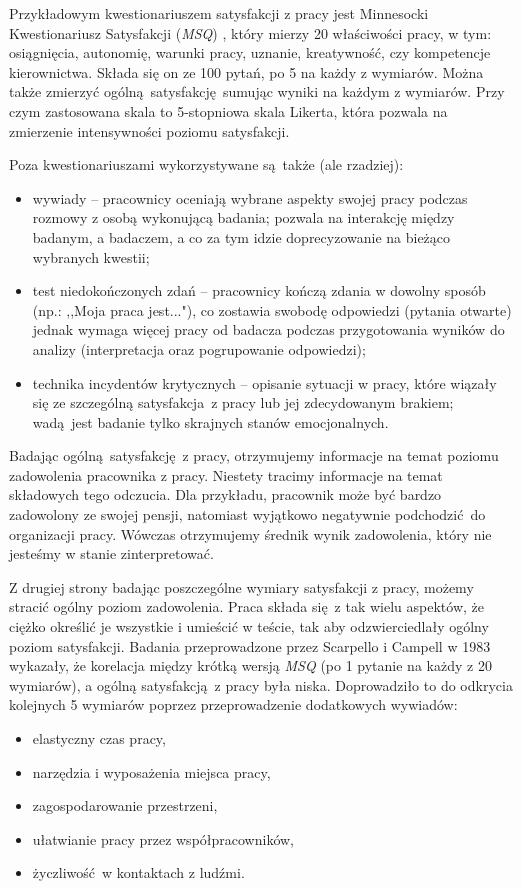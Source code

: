 Przykładowym kwestionariuszem satysfakcji z pracy jest Minnesocki Kwestionariusz Satysfakcji (\emph{MSQ}) \cite{weiss1967manual}, który mierzy 20 właściwości pracy, w tym: osiągnięcia, autonomię, warunki pracy, uznanie, kreatywność, czy kompetencje kierownictwa. Składa się on ze 100 pytań, po 5 na każdy z wymiarów. Można także zmierzyć
ogólną satysfakcję sumując wyniki na każdym z wymiarów. Przy czym zastosowana skala to 5-stopniowa skala Likerta, która pozwala na zmierzenie intensywności poziomu satysfakcji.

Poza kwestionariuszami wykorzystywane są także (ale rzadziej):
\begin{itemize}
\item wywiady -- pracownicy oceniają wybrane aspekty swojej pracy podczas rozmowy z osobą wykonującą badania; pozwala na interakcję między badanym, a badaczem, a co za tym idzie doprecyzowanie na bieżąco wybranych kwestii;
\item test niedokończonych zdań -- pracownicy kończą zdania w dowolny sposób (np.: ,,Moja praca jest..."), co zostawia swobodę odpowiedzi (pytania otwarte) jednak wymaga więcej pracy od badacza podczas przygotowania wyników do analizy (interpretacja oraz pogrupowanie odpowiedzi);
\item technika incydentów krytycznych -- opisanie sytuacji w pracy, które wiązały się ze szczególną satysfakcja z pracy lub jej zdecydowanym brakiem; wadą jest badanie tylko skrajnych stanów emocjonalnych.
\end{itemize}

Badając ogólną satysfakcję z pracy, otrzymujemy informacje na temat poziomu zadowolenia pracownika z pracy. Niestety tracimy informacje na temat składowych tego odczucia. Dla przykładu, pracownik może być bardzo zadowolony ze swojej pensji, natomiast wyjątkowo negatywnie podchodzić do organizacji pracy. Wówczas otrzymujemy średnik wynik zadowolenia, który nie jesteśmy w stanie zinterpretować.

Z drugiej strony badając poszczególne wymiary satysfakcji z pracy, możemy stracić ogólny poziom zadowolenia. Praca składa się z tak wielu aspektów, że ciężko określić je wszystkie i umieścić w teście, tak aby odzwierciedlały ogólny poziom satysfakcji. Badania przeprowadzone przez Scarpello i Campell w 1983 \cite{scarpello1983job} wykazały, że korelacja między krótką wersją \emph{MSQ} (po 1 pytanie na każdy z 20 wymiarów), a ogólną satysfakcją z pracy była niska. Doprowadziło to do odkrycia
kolejnych 
5 wymiarów poprzez przeprowadzenie dodatkowych wywiadów:
\begin{itemize}
\item elastyczny czas pracy,
\item narzędzia i wyposażenia miejsca pracy,
\item zagospodarowanie przestrzeni,
\item ułatwianie pracy przez współpracowników,
\item życzliwość w kontaktach z ludźmi.
\end{itemize}
